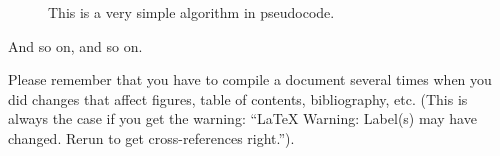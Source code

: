 \documentclass[12pt]{report}
\begin{document}
	\begin{figure}[htb]
		\begin{center}
		\end{center}
		\caption{This is a very simple algorithm in pseudocode.}
		\label{fig:source_algo1}
	\end{figure}
	
	\noindent
	And so on, and so on.
	
	Please remember that you have to compile a document several times when
	you did changes that affect figures, table of contents, bibliography,
	etc. (This is always the case if you get the warning: ``LaTeX Warning:
	Label(s) may have changed. Rerun to get cross-references right.'').
	
\end{document}
